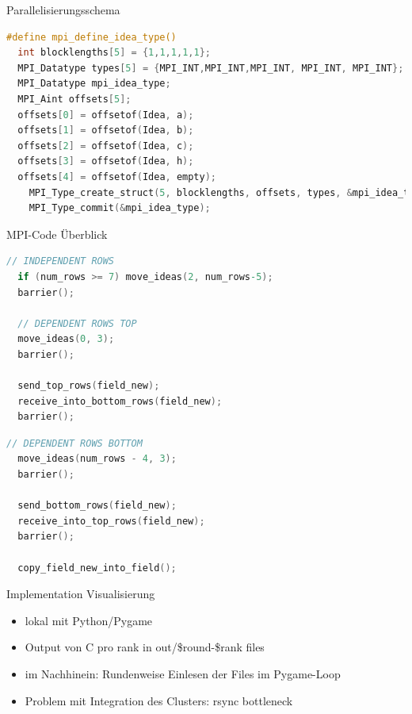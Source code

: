 \begin{frame}[fragile]{Parallelisierungsschema}
\begin{lstlisting}[language=C,basicstyle=\small,breaklines=true,keywordstyle=\color{black}]
#define mpi_define_idea_type()                                               
  int blocklengths[5] = {1,1,1,1,1};                                  
  MPI_Datatype types[5] = {MPI_INT,MPI_INT,MPI_INT, MPI_INT, MPI_INT};       
  MPI_Datatype mpi_idea_type;                                                
  MPI_Aint offsets[5];                                                   
  offsets[0] = offsetof(Idea, a);                                            
  offsets[1] = offsetof(Idea, b);                                            
  offsets[2] = offsetof(Idea, c);                                            
  offsets[3] = offsetof(Idea, h);                                            
  offsets[4] = offsetof(Idea, empty);                                        
    MPI_Type_create_struct(5, blocklengths, offsets, types, &mpi_idea_type); 
    MPI_Type_commit(&mpi_idea_type);                                         
\end{lstlisting}
\end{frame}

\begin{frame}{MPI-Code Überblick}
\begin{lstlisting}[language=C,basicstyle=\small,breaklines=true,keywordstyle=\color{black}]
  // INDEPENDENT ROWS
  if (num_rows >= 7) move_ideas(2, num_rows-5);
  barrier();

  // DEPENDENT ROWS TOP
  move_ideas(0, 3); 
  barrier();

  send_top_rows(field_new);
  receive_into_bottom_rows(field_new);
  barrier();
\end{lstlisting}
\begin{lstlisting}[language=C,basicstyle=\small,breaklines=true,keywordstyle=\color{black}]
  // DEPENDENT ROWS BOTTOM
  move_ideas(num_rows - 4, 3);  
  barrier();

  send_bottom_rows(field_new);
  receive_into_top_rows(field_new);
  barrier();

  copy_field_new_into_field();
\end{lstlisting}
\end{frame}

\begin{frame}{Implementation Visualisierung}
	\begin{itemize}
		\item lokal mit Python/Pygame
		\item Output von C pro rank in out/\$round-\$rank files
		\item im Nachhinein: Rundenweise Einlesen der Files im Pygame-Loop
		\item Problem mit Integration des Clusters: rsync bottleneck
	\end{itemize}
\end{frame}

